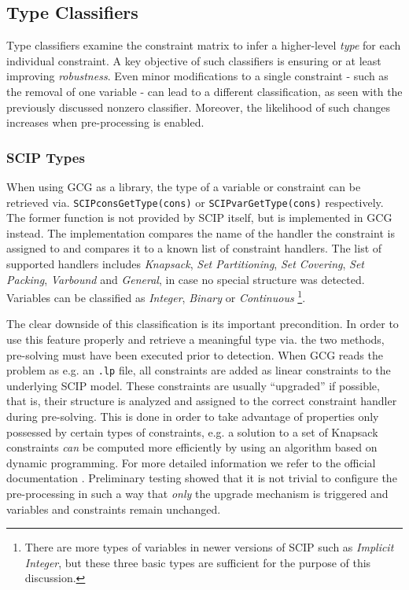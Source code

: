 				\clearpage
		
		\subsection{Type Classifiers}
		\label{chap:gcg:classifiers:type}
		
			Type classifiers examine the constraint matrix to infer a higher-level \textit{type} for each individual constraint.
			A key objective of such classifiers is ensuring or at least improving \textit{robustness}.
			Even minor modifications to a single constraint - such as the removal of one variable - can lead to a different classification, as seen with the previously discussed nonzero classifier.
			Moreover, the likelihood of such changes increases when pre-processing is enabled.
			
			\subsubsection{SCIP Types}
			
				When using \ac{GCG} as a library, the type of a variable or constraint can be retrieved via. \lstinline|SCIPconsGetType(cons)| or \lstinline|SCIPvarGetType(cons)| respectively.
				The former function is not provided by \ac{SCIP} itself, but is implemented in \ac{GCG} instead.
				The implementation compares the name of the handler the constraint is assigned to and compares it to a known list of constraint handlers. 
				The list of supported handlers includes \emph{Knapsack}, \emph{Set Partitioning}, \emph{Set Covering}, \emph{Set Packing}, \emph{Varbound} and \emph{General}, in case no special structure was detected. 
				Variables can be classified as \emph{Integer}, \emph{Binary} or \emph{Continuous}
				\footnote{There are more types of variables in newer versions of \ac{SCIP} such as \emph{Implicit Integer}, but these three basic types are sufficient for the purpose of this discussion.}.
				
				The clear downside of this classification is its important precondition.
				In order to use this feature properly and retrieve a meaningful type via. the two methods, pre-solving must have been executed prior to detection.
				When \ac{GCG} reads the problem as e.g. an \lstinline|.lp| file, all constraints are added as linear constraints to the underlying \ac{SCIP} model.
				These constraints are usually \enquote{upgraded} if possible, that is, their structure is analyzed and assigned to the correct constraint handler during pre-solving.
				This is done in order to take advantage of properties only possessed by certain types of constraints, e.g. a solution to a set of Knapsack constraints \textit{can} be computed more efficiently by using an algorithm based on dynamic programming.
				For more detailed information we refer to the official documentation \cite{SCIPDoxygenDocumentation}.
				Preliminary testing showed that it is not trivial to configure the pre-processing in such a way that \textit{only} the upgrade mechanism is triggered and variables and constraints remain unchanged. 
		
